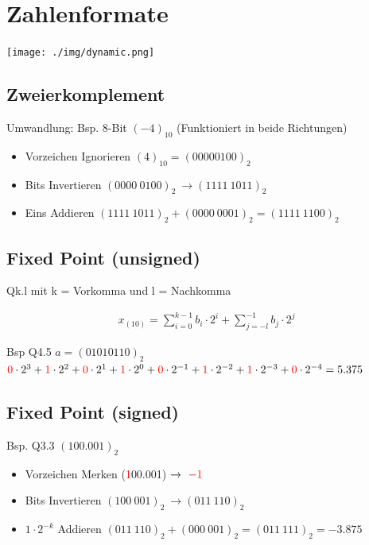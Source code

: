 \documentclass[10pt,a4paper]{article}
\begin{document}
\twocolumn
\pagestyle{fancy}
\section{Zahlenformate}
\begin{center}
  \texttt{[image: ./img/dynamic.png]}
\end{center}
  \subsection{Zweierkomplement}
  Umwandlung: Bsp. 8-Bit $(-4)_{10}$ (Funktioniert in beide Richtungen)
  \begin{itemize}
      \item Vorzeichen Ignorieren $(4)_{10} = (0000 0100)_2$
      \item Bits Invertieren $(0000 \ 0100)_2 \ \rightarrow (1111\ 1011)_2$
      \item Eins Addieren $(1111\ 1011)_2 + (0000\ 0001)_2 = (1111\ 1100)_2$
  \end{itemize} 
  \subsection{Fixed Point (unsigned)}
Qk.l mit k = Vorkomma und l = Nachkomma
  \begin{mdframed}[style=exercise]
    \begin{align}
        x_{(10)} = \sum_{i=0}^{k-1} b_i\cdot 2^i + \sum_{j=-l}^{-1} b_j\cdot 2^j
    \end{align}
  \end{mdframed}
Bsp Q4.5 $a=(0101 0110)_2$ \\
$\textcolor{red}{0}\cdot 2^3+\textcolor{red}{1}\cdot 2^2+\textcolor{red}{0}\cdot 2^{1}+\textcolor{red}{1}\cdot 2^0+\textcolor{red}{0}\cdot 2^{-1}+\textcolor{red}{1}\cdot 2^{-2}+\textcolor{red}{1}\cdot 2^{-3}+\textcolor{red}{0}\cdot 2^{-4}=5.375$

  \subsection{Fixed Point (signed)}
Bsp. Q3.3 $(100.001)_2$ 
  \begin{itemize}
      \item Vorzeichen Merken (\textcolor{red}{1}00.001) $\rightarrow \ \textcolor{red}{-1}$
      \item Bits Invertieren $(100 \ 001)_2 \ \rightarrow (011\ 110)_2$
      \item $1\cdot 2^{-k}$ Addieren $(011\ 110)_2 + (000\ 001)_2 = (011\ 111)_2 = -3.875$
  \end{itemize} 
\end{document}
